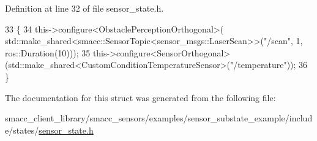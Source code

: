 Definition at line 32 of file sensor\+\_\+state.\+h.


\begin{DoxyCode}
33   \{
34     this->configure<ObstaclePerceptionOrthogonal>(
      std::make\_shared<smacc::SensorTopic<sensor\_msgs::LaserScan>>(\textcolor{stringliteral}{"/scan"}, 1, ros::Duration(10)));
35     this->configure<SensorOrthogonal>(std::make\_shared<CustomConditionTemperatureSensor>(\textcolor{stringliteral}{"/temperature"}));
36   \}
\end{DoxyCode}


The documentation for this struct was generated from the following file\+:\begin{DoxyCompactItemize}
\item 
smacc\+\_\+client\+\_\+library/smacc\+\_\+sensors/examples/sensor\+\_\+substate\+\_\+example/include/states/\hyperlink{sensor__state_8h}{sensor\+\_\+state.\+h}\end{DoxyCompactItemize}
